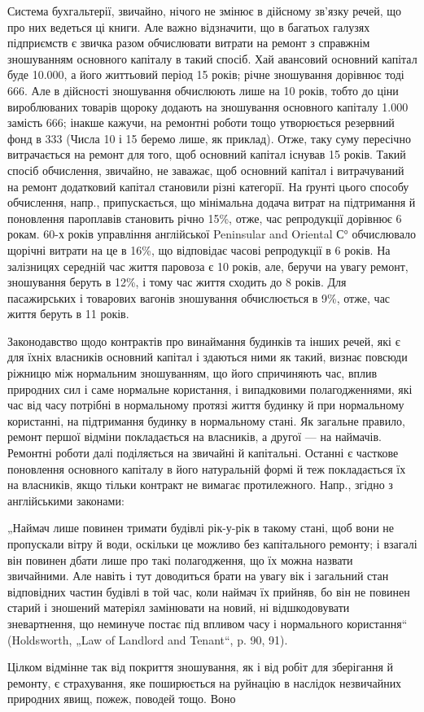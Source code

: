 Система бухгальтерії, звичайно, нічого не змінює в дійсному зв’язку речей, що про них ведеться ці
книги. Але важно відзначити, що в багатьох
галузях підприємств є звичка разом обчислювати витрати на ремонт з справжнім зношуванням
основного капіталу в такий спосіб. Хай авансовий основний капітал буде \num{10.000}, а його
життьовий період 15 років; річне зношування дорівнює тоді 666. Але в дійсності
зношування обчислюють лише на 10 років, тобто до ціни вироблюваних товарів щороку додають на
зношування основного капіталу \num{1.000} замість 666; інакше кажучи, на ремонтні
роботи тощо утворюється резервний фонд в 333 (Числа 10 і 15 беремо лише, як приклад).
Отже, таку суму пересічно витрачається на ремонт для того, щоб основний капітал існував 15 років.
Такий спосіб обчислення, звичайно, не заважає, щоб основний капітал і витрачуваний на ремонт
додатковий капітал становили різні категорії. На ґрунті цього способу обчислення, напр.,
припускається, що мінімальна додача витрат на підтримання й поновлення пароплавів становить річно
15\%, отже, час репродукції дорівнює 6 рокам. 60-х років управління англійської Peninsular and
Oriental С° обчислювало щорічні витрати на це в 16\%, що відповідає часові репродукції в 6 років.
На залізницях середній час життя паровоза є 10 років, але, беручи на увагу ремонт, зношування беруть
в 12\%, і тому час життя сходить до 8 років. Для пасажирських і товарових вагонів зношування
обчислюється в 9\%, отже, час життя беруть в 11 років.

Законодавство щодо контрактів про винаймання будинків та інших речей, які є для їхніх власників
основний капітал і здаються ними як такий, визнає повсюди ріжницю між нормальним зношуванням, що
його спричиняють час, вплив природних сил і саме нормальне користання, і випадковими полагодженнями,
які час від часу потрібні в нормальному протязі життя будинку й при нормальному користанні, на
підтримання будинку в нормальному стані. Як загальне правило, ремонт першої відміни покладається на
власників, а другої — на наймачів. Ремонтні роботи далі поділяється на звичайні й капітальні.
Останні є часткове поновлення основного капіталу в його натуральній формі й теж покладається їх на
власників, якщо тільки контракт не вимагає протилежного. Напр., згідно з англійськими законами:

„Наймач лише повинен тримати будівлі рік-у-рік в такому стані, щоб вони не пропускали вітру й води,
оскільки це можливо без капітального ремонту; і взагалі він повинен дбати лише про такі
полагодження, що їх можна назвати звичайними. Але навіть і тут доводиться брати на увагу вік і
загальний стан відповідних частин будівлі в той час, коли наймач їх прийняв, бо він не повинен
старий і зношений матеріял замінювати на новий, ні відшкодовувати зневартнення, що неминуче постає
під впливом часу і нормального користання“ (Holdsworth, „Law of Landlord and Tenant“, p. 90, 91).

Цілком відмінне так від покриття зношування, як і від робіт для зберігання й ремонту, є страхування,
яке поширюється на руйнацію в наслідок незвичайних природних явищ, пожеж, поводей тощо. Воно
\parbreak{}  %
